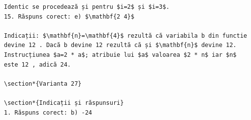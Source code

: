 \documentclass[10pt]{article}
\begin{document}
\begin{verbatim}
Identic se procedează și pentru $i=2$ și $i=3$.
15. Răspuns corect: e) $\mathbf{2 4}$

Indicații: $\mathbf{n}=\mathbf{4}$ rezultă că variabila b din functie devine 12 . Dacă b devine 12 rezultă că și $\mathbf{n}$ devine 12. Instrucțiunea $a=2 * a$; atribuie lui $a$ valoarea $2 * n$ iar $n$ este 12 , adică 24.

\section*{Varianta 27}

\section*{Indicații și răspunsuri}
1. Răspuns corect: b) -24


\end{verbatim}
\end{document}
